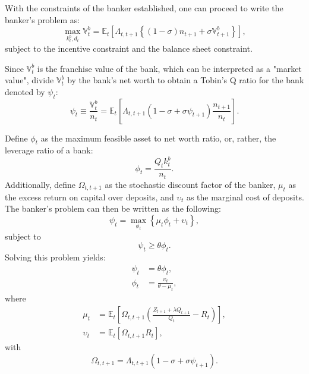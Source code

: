 \documentclass[12pt,english]{extarticle}
\newcommand{\E}{\mathbb{E}}
\begin{document}
	With the constraints of the banker established, one can proceed to write the banker's problem as:
	\begin{equation*}
		\max_{k_t^b,d_t} \mathbb{V}_t^b = \E_t \left[ \Lambda_{t,t+1} \left\{ (1-\sigma)n_{t+1}+\sigma \mathbb{V}_{t+1}^b \right\} \right],
	\end{equation*}
	subject to the incentive constraint and the balance sheet constraint.
	
	Since $\mathbb{V}_t^b$ is the franchise value of the bank, which can be interpreted as a "market value", divide $\mathbb{V}_t^b$ by the bank's net worth to obtain a Tobin's Q ratio for the bank denoted by $\psi_t$:
	\begin{equation*}
		\psi_t \equiv \frac{\mathbb{V}_t^b}{n_t} = \E_t \left[ \Lambda_{t,t+1}(1-\sigma+\sigma\psi_{t+1})\frac{n_{t+1}}{n_t} \right].
	\end{equation*}
	
	Define $\phi_t$ as the maximum feasible asset to net worth ratio, or, rather, the leverage ratio of a bank:
	\begin{equation*}
		\phi_t = \frac{Q_t k_t^b}{n_t}.
	\end{equation*}
	Additionally, define $\Omega_{t,t+1}$ as the stochastic discount factor of the banker, $\mu_t$ as the excess return on capital over deposits, and $\upsilon_t$ as the marginal cost of deposits. The banker's problem can then be written as the following:
	\begin{equation*}
		\psi_t = \max_{\phi_t}\left\{ \mu_t\phi_t + \upsilon_t \right\},
	\end{equation*}
	subject to
	\begin{equation*}
		\psi_t \geq \theta\phi_t.
	\end{equation*}
	Solving this problem yields:
	\begin{align}
		\label{eq:psi solution}
		\psi_t &= \theta\phi_t, \\
		\label{eq:phi solution Tobin Q}
		\phi_t &= \frac{\upsilon_t}{\theta - \mu_t},
	\end{align}
	where
	\begin{align}
		\label{eq:mu excess return on capital}
		\mu_t &= \E_t \left[ \Omega_{t,t+1} \left(\frac{Z_{t+1}+\lambda Q_{t+1}}{Q_t} - R_t \right) \right], \\
		\label{eq:upsilon marginal cost of deposits}
		\upsilon_t &= \E_t \left[ \Omega_{t,t+1}R_t \right],
	\end{align}
	with
	\begin{equation*}
		\Omega_{t,t+1} = \Lambda_{t,t+1}(1-\sigma+\sigma\psi_{t+1}).
	\end{equation*}
	
\end{document}

